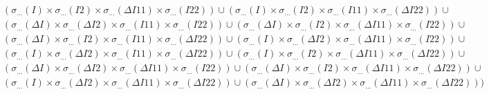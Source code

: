 \begin{eqnarray*}
&&(\sigma_{\dots}(I) \times   \sigma_{\dots}(I2) \times  \sigma_{\dots}(\Delta I11) \times   \sigma_{\dots}(I22)) \cup 
(\sigma_{\dots}(I) \times   \sigma_{\dots}(I2) \times   \sigma_{\dots}(I11) \times  \sigma_{\dots}(\Delta I22)) \cup \\
&&(\sigma_{\dots}(\Delta I) \times  \sigma_{\dots}(\Delta I2) \times   \sigma_{\dots}(I11) \times   \sigma_{\dots}(I22)) \cup 
(\sigma_{\dots}(\Delta I) \times   \sigma_{\dots}(I2) \times  \sigma_{\dots}(\Delta I11) \times   \sigma_{\dots}(I22)) \cup \\
&&(\sigma_{\dots}(\Delta I) \times   \sigma_{\dots}(I2) \times   \sigma_{\dots}(I11) \times  \sigma_{\dots}(\Delta  I22)) \cup 
(\sigma_{\dots}(I) \times  \sigma_{\dots}(\Delta I2) \times  \sigma_{\dots}(\Delta I11) \times   \sigma_{\dots}(I22)) \cup \\
&&(\sigma_{\dots}(I) \times  \sigma_{\dots}(\Delta I2) \times   \sigma_{\dots}(I11) \times  \sigma_{\dots}(\Delta I22)) \cup 
(\sigma_{\dots}(I) \times   \sigma_{\dots}(I2) \times  \sigma_{\dots}(\Delta I11) \times  \sigma_{\dots}(\Delta I22)) \cup \\
&&(\sigma_{\dots}(\Delta I) \times  \sigma_{\dots}(\Delta I2) \times  \sigma_{\dots}(\Delta I11) \times   \sigma_{\dots}(I22)) \cup 
(\sigma_{\dots}(\Delta I) \times   \sigma_{\dots}(I2) \times  \sigma_{\dots}(\Delta I11) \times  \sigma_{\dots}(\Delta I22)) \cup \\
&&(\sigma_{\dots}(I) \times  \sigma_{\dots}(\Delta I2) \times  \sigma_{\dots}(\Delta I11) \times  \sigma_{\dots}(\Delta I22)) \cup 
(\sigma_{\dots}(\Delta I) \times   \sigma_{\dots}(\Delta I2) \times  \sigma_{\dots}(\Delta I11) \times  \sigma_{\dots}(\Delta I22))) \\
\end{eqnarray*}
%
